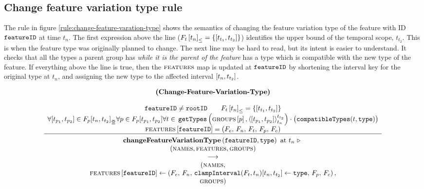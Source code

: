\subsection{Change feature variation type rule}
\label{sub:change-feature-variation-type-rule}
The rule in figure \vref{rule:change-feature-varation-type} shows the semantics of changing the feature variation type of the feature with ID $\texttt{featureID}$ at time $t_n$. The first expression above the line ($\containing{F_t}{t_n} = \set{\interval{t_{t_1}}{t_{t_2}}}$) identifies the upper bound of the temporal scope, $t_{t_2}$. This is when the feature type was originally planned to change. The next line may be hard to read, but its intent is easier to understand. It checks that all the types a parent group has \emph{while it is the parent of the feature} has a type which is compatible with the new type of the feature. If everything above the line is true, then the $\textsc{features}{}$ map is updated at $\texttt{featureID}$ by shortening the interval key for the original type at $t_n$, and assigning the new type to the affected interval $\interval{t_n}{t_{t_2}}$. 


\begin{figure}
    \renewcommand{\arraystretch}{1.1}
    \sossize$$\begin{array}{c}
      \ntyperule{Change-Feature-Variation-Type}
      {\\
        \var{featureID} \neq \var{rootID} \qquad
        \containing{F_t}{t_n} = \set{\interval{t_{t_1}}{t_{t_2}}} %
        \\
        \forall \interval{t_{p_1}}{t_{p_2}} \in \overlapping{F_p}{t_n}{t_{t_2}} %
        \forall p \in F_p \interval{t_{p_1}}{t_{p_2}} %
        \forall t \in \, \var{getTypes}\left(\lookup{\groups}{p}, \clamp{\interval{t_{p_1}}{t_{p_2}}}{t_n}{t_{t_2}}\right)
        \cdot \big(\var{compatibleTypes}(t, \var{type})\big)\\
        \lookup{\features{}}{\var{featureID}} = \left( F_e,\, F_n,\, F_t,\, F_p,\, F_c \right)
      }
      {
        \textbf{changeFeatureVariationType}\left( \var{featureID}, \var{type}\right) \text{ at } t_n \shove \\
        (\names{}, \features{}, \groups{}) \\
        \transition \\
        (\names{}, \\
        \lookup{\features{}}{\var{featureID}} \assign \left( F_e,\, F_n,\, 
        \var{clampInterval}(F_t, t_n)\interval{t_n}{t_{t_2}} \assign \var{type},\, F_p,\, F_c \right),
        \\ \groups{})
      }
    \end{array}$$
  \caption{\label{rule:change-feature-varation-type}}
\end{figure}

